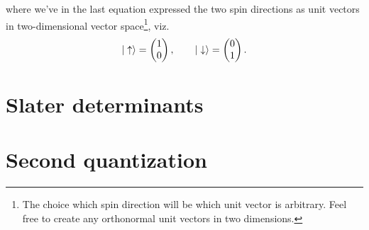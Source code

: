         where we've in the last equation expressed the two spin directions as
        unit vectors in two-dimensional vector space\footnote{The choice which
        spin direction will be which unit vector is arbitrary. Feel free to
        create any orthonormal unit vectors in two dimensions.}, viz.
        \begin{align}
            | \uparrow \rangle
            =
            \begin{pmatrix}
                1 \\
                0
            \end{pmatrix},
            \qquad
            | \downarrow \rangle
            =
            \begin{pmatrix}
                0 \\
                1
            \end{pmatrix}.
        \end{align}

    \section{Slater determinants}

    \section{Second quantization}

